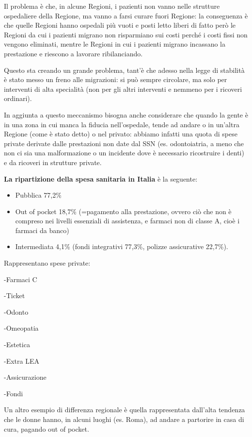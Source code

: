 \documentclass[]{article}
\begin{document}
Il problema è che, in alcune Regioni, i pazienti non vanno nelle
strutture ospedaliere della Regione, ma vanno a farsi curare fuori
Regione: la conseguenza è che quelle Regioni hanno ospedali più vuoti e
posti letto liberi di fatto però le Regioni da cui i pazienti migrano
non risparmiano sui costi perché i costi fissi non vengono eliminati,
mentre le Regioni in cui i pazienti migrano incassano la prestazione e
riescono a lavorare ribilanciando.

Questo sta creando un grande problema, tant'è che adesso nella legge di
stabilità è stato messo un freno alle migrazioni: si può sempre
circolare, ma solo per interventi di alta specialità (non per gli altri
interventi e nemmeno per i ricoveri ordinari).

In aggiunta a questo meccanismo bisogna anche considerare che quando la
gente è in una zona in cui manca la fiducia nell'ospedale, tende ad
andare o in un'altra Regione (come è stato detto) o nel privato: abbiamo
infatti una quota di spese private derivate dalle prestazioni non date
dal SSN (es. odontoiatria, a meno che non ci sia una malformazione o un
incidente dove è necessario ricostruire i denti) e da ricoveri in
strutture private.

\textbf{La ripartizione della spesa sanitaria in Italia} è la seguente:

\begin{itemize}
\item
  Pubblica 77,2\%
\item
  Out of pocket 18,7\% (=pagamento alla prestazione, ovvero ciò che non
  è compreso nei livelli essenziali di assistenza, e farmaci non di
  classe A, cioè i farmaci da banco)
\item
  Intermediata 4,1\% (fondi integrativi 77,3\%, polizze assicurative
  22,7\%).
\end{itemize}

Rappresentano spese private:

-Farmaci C

-Ticket

-Odonto

-Omeopatia

-Estetica

-Extra LEA

-Assicurazione

-Fondi

Un altro esempio di differenza regionale è quella rappresentata
dall'alta tendenza che le donne hanno, in alcuni luoghi (es. Roma), ad
andare a partorire in casa di cura, pagando out of pocket.
\end{document}
